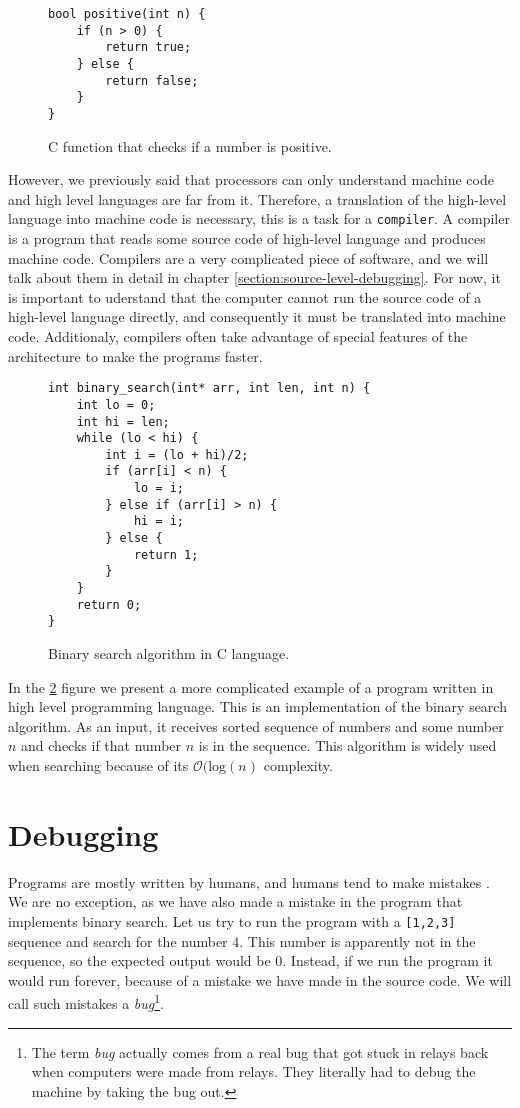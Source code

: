 \begin{figure}\label{fig:c-positive}
\begin{verbatim}
bool positive(int n) {
    if (n > 0) {
        return true;
    } else {
        return false;
    }
}
\end{verbatim}
\caption{C function that checks if a number is positive.}
\end{figure}

However, we previously said that processors can only understand machine code
and high level languages are far from it. Therefore, a translation of the
high-level language into machine code is necessary, this is a task for a
\texttt{compiler}. A compiler is a program that reads some source code of
high-level language and produces machine code. Compilers are a very complicated
piece of software, and we will talk about them in detail in chapter
\ref{section:source-level-debugging}. For now, it is important to uderstand
that the computer cannot run the source code of a high-level language directly,
and consequently it must be translated into machine code. Additionaly,
compilers often take advantage of special features of the architecture to make
the programs faster.

\begin{figure}[H]\label{fig:binary-search}
    \begin{verbatim}
int binary_search(int* arr, int len, int n) {
    int lo = 0;
    int hi = len;
    while (lo < hi) {
        int i = (lo + hi)/2;
        if (arr[i] < n) {
            lo = i;
        } else if (arr[i] > n) {
            hi = i;
        } else {
            return 1;
        }
    }
    return 0;
}
    \end{verbatim}
    \caption{Binary search algorithm in C language.}
\end{figure}

In the \ref{fig:binary-search} figure we present a more complicated example of
a program written in high level programming language. This is an implementation
of the binary search algorithm. As an input, it receives sorted sequence of
numbers and some number $n$ and checks if that number $n$ is in the sequence.
This algorithm is widely used when searching because of its
$\mathcal{O}(\text{log}(n)$ complexity.

\section{Debugging}
Programs are mostly written by humans, and humans tend to make mistakes
\cite{human-error}. We are no exception, as we have also made a mistake in the
program that implements binary search. Let us try to run the program with a
\texttt{[1,2,3]} sequence and search for the number $4$. This number is
apparently not in the sequence, so the expected output would be $0$. Instead,
if we run the program it would run forever, because of a mistake we have made
in the source code. We will call such mistakes a \textit{bug}\footnote{The term
\textit{bug} actually comes from a real bug that got stuck in relays back when
computers were made from relays. They literally had to debug the machine by
taking the bug out.}.

